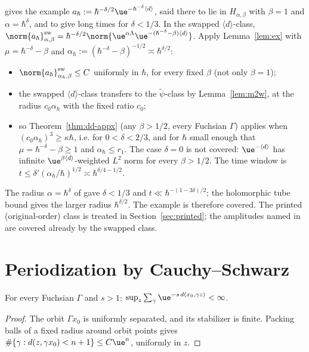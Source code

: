 \begin{remark}
\cite[Remark~1.7, (1.38)]{S} gives the example $a_\hbar:=\hbar^{-\delta/2}\ue^{-\hbar^{-\delta}\langle d\rangle}$, said there to lie in $H_{\alpha,\beta}$ with $\beta=1$ and $\alpha=\hbar^\delta$, and to give long times for $\delta<1/3$. In the swapped $\langle d\rangle$-class, $\norm{a_\hbar}^{\rm sw}_{\alpha,\beta}=\hbar^{-\delta/2}\norm{\ue^{\alpha\Lambda}\ue^{-(\hbar^{-\delta}-\beta)\langle d\rangle}}$. Apply Lemma~\ref{lem:ex} with $\mu=\hbar^{-\delta}-\beta$ and $\alpha_\hbar:=(\hbar^{-\delta}-\beta)^{-1/2}\asymp\hbar^{\delta/2}$:
\begin{itemize}
\item $\norm{a_\hbar}^{\rm sw}_{\alpha_\hbar,\beta}\le C$ uniformly in $\hbar$, for every fixed $\beta$ (not only $\beta=1$);
\item the swapped $\langle d\rangle$-class transfers to the $\tilde\psi$-class by Lemma~\ref{lem:m2w}, at the radius $c_0\alpha_\hbar$ with the fixed ratio $c_0$;
\item so Theorem~\ref{thm:dd-appx} (any $\beta>1/2$, every Fuchsian $\Gamma$) applies when $(c_0\alpha_\hbar)^3\ge\kappa\hbar$, i.e. for $0<\delta<2/3$, and for $\hbar$ small enough that $\mu=\hbar^{-\delta}-\beta\ge1$ and $\alpha_\hbar\le r_1$. The case $\delta=0$ is not covered: $\ue^{-\langle d\rangle}$ has infinite $\ue^{\beta\langle d\rangle}$-weighted $L^2$ norm for every $\beta>1/2$. The time window is $t\le\delta'(\alpha_\hbar/\hbar)^{1/2}\asymp\hbar^{\delta/4-1/2}$.
\end{itemize}
The radius $\alpha=\hbar^\delta$ of \cite{S} gave $\delta<1/3$ and $t\ll\hbar^{-(1-3\delta)/2}$; the holomorphic tube bound gives the larger radius $\hbar^{\delta/2}$. The example is therefore covered. The printed (original-order) class is treated in Section~\ref{sec:printed}; the amplitudes named in \cite{S} are covered already by the swapped class.
\end{remark}

\section{Periodization by Cauchy--Schwarz}\label{sec:t2}

\begin{lemma}[P1]\label{lem:p1}
For every Fuchsian $\Gamma$ and $s>1$: $\sup_{z}\sum_{\gamma}\ue^{-s\,d(x_0,\gamma z)}<\infty$.
\end{lemma}
\begin{proof}
The orbit $\Gamma x_0$ is uniformly separated, and its stabilizer is finite. Packing balls of a fixed radius
around orbit points gives $\#\{\gamma:d(z,\gamma x_0)<n+1\}\le C\ue^{n}$, uniformly in $z$.
\end{proof}

